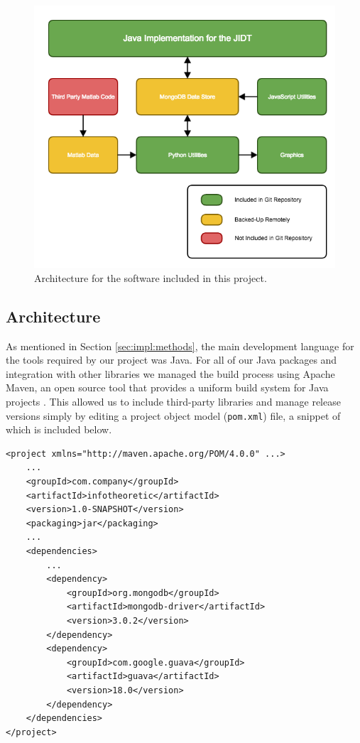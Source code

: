 \documentclass[a4paper,11pt]{article}
\begin{document}
\begin{figure}[H]
\begin{center}
\includegraphics[scale = 0.5]{figures/architecture}
\caption{
	Architecture for the software included in this project.
	\label{fig:architecture}
}
\end{center}
\end{figure}

\subsection{Architecture}

As mentioned in Section \ref{sec:impl:methods}, the main development language for the tools required by our project was Java. For all of our Java packages and integration with other libraries we managed the build process using Apache Maven, an open source tool that provides a uniform build system for Java projects \cite{TheApacheSoftwareFoundation}. This allowed us to include third-party libraries and manage release versions simply by editing a project object model (\texttt{pom.xml}) file, a snippet of which is included below.

\begin{verbatim}
<project xmlns="http://maven.apache.org/POM/4.0.0" ...>
	...
	<groupId>com.company</groupId>
	<artifactId>infotheoretic</artifactId>
	<version>1.0-SNAPSHOT</version>
	<packaging>jar</packaging>
	...
	<dependencies> 
		...
		<dependency>
			<groupId>org.mongodb</groupId>
			<artifactId>mongodb-driver</artifactId>
			<version>3.0.2</version>
		</dependency>
		<dependency>
			<groupId>com.google.guava</groupId>
			<artifactId>guava</artifactId>
			<version>18.0</version>
		</dependency>
	</dependencies>
</project>
\end{verbatim}
\end{document}
